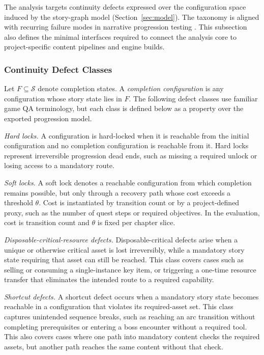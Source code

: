 \documentclass[conference]{IEEEtran}
\newcommand{\States}{\mathcal{S}}
\begin{document}
The analysis targets continuity defects expressed over the configuration
space induced by the story-graph model (Section~\ref{sec:model}). The
taxonomy is aligned with recurring failure modes in narrative progression
testing \cite{Coppola2024CoverageMetrics,Coppola2024KnowYourBugs}. This
subsection also defines the minimal interfaces required to connect the
analysis core to project-specific content pipelines and engine builds.

\subsubsection{Continuity Defect Classes}
\label{sec:defect-classes}

Let $F \subseteq \States$ denote completion states. A \emph{completion
configuration} is any configuration whose story state lies in $F$. The
following defect classes use familiar game QA terminology, but each class
is defined below as a property over the exported progression model.

\noindent\emph{Hard locks.}
A configuration is hard-locked when it is reachable from the initial
configuration and no completion configuration is reachable from it.
Hard locks represent irreversible progression dead ends, such as missing
a required unlock or losing access to a mandatory route.

\noindent\emph{Soft locks.}
A soft lock denotes a reachable configuration from which completion
remains possible, but only through a recovery path whose cost exceeds a
threshold $\theta$. Cost is instantiated by transition count or by a
project-defined proxy, such as the number of quest steps or required
objectives. In the evaluation, cost is transition count and $\theta$ is
fixed per chapter slice.

\noindent\emph{Disposable-critical-resource defects.}
Disposable-critical defects arise when a unique or otherwise critical
asset is lost irreversibly, while a mandatory story state requiring that
asset can still be reached. This class
covers cases such as selling or consuming a single-instance key item, or
triggering a one-time resource transfer that eliminates the intended
route to a required capability.

\noindent\emph{Shortcut defects.}
A shortcut defect occurs when a mandatory story state becomes reachable
in a configuration that violates its required-asset set. This class
captures unintended sequence breaks, such as reaching an arc transition
without completing prerequisites or entering a boss encounter without a
required tool. This also covers cases where one path into mandatory content checks the
required assets, but another path reaches the same content without that
check.
\end{document}
